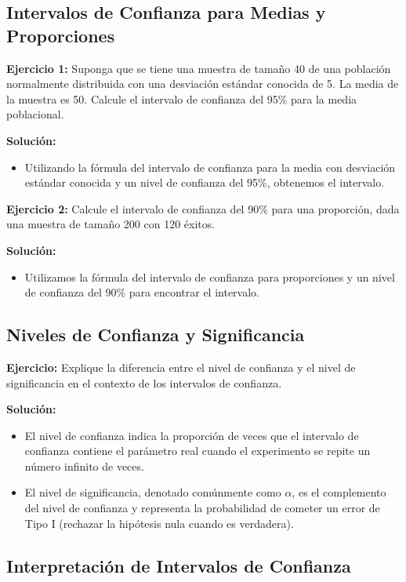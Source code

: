 \documentclass{article}
\begin{document}
\subsection{Intervalos de Confianza para Medias y Proporciones}

\textbf{Ejercicio 1:} Suponga que se tiene una muestra de tamaño 40 de una población normalmente distribuida con una desviación estándar conocida de 5. La media de la muestra es 50. Calcule el intervalo de confianza del 95\% para la media poblacional.

\textbf{Solución:}
\begin{itemize}
    \item Utilizando la fórmula del intervalo de confianza para la media con desviación estándar conocida y un nivel de confianza del 95\%, obtenemos el intervalo.
\end{itemize}

\textbf{Ejercicio 2:} Calcule el intervalo de confianza del 90\% para una proporción, dada una muestra de tamaño 200 con 120 éxitos.

\textbf{Solución:}
\begin{itemize}
    \item Utilizamos la fórmula del intervalo de confianza para proporciones y un nivel de confianza del 90\% para encontrar el intervalo.
\end{itemize}

\subsection{Niveles de Confianza y Significancia}

\textbf{Ejercicio:} Explique la diferencia entre el nivel de confianza y el nivel de significancia en el contexto de los intervalos de confianza.

\textbf{Solución:}
\begin{itemize}
    \item El nivel de confianza indica la proporción de veces que el intervalo de confianza contiene el parámetro real cuando el experimento se repite un número infinito de veces.
    \item El nivel de significancia, denotado comúnmente como $\alpha$, es el complemento del nivel de confianza y representa la probabilidad de cometer un error de Tipo I (rechazar la hipótesis nula cuando es verdadera).
\end{itemize}

\subsection{Interpretación de Intervalos de Confianza}
\end{document}
